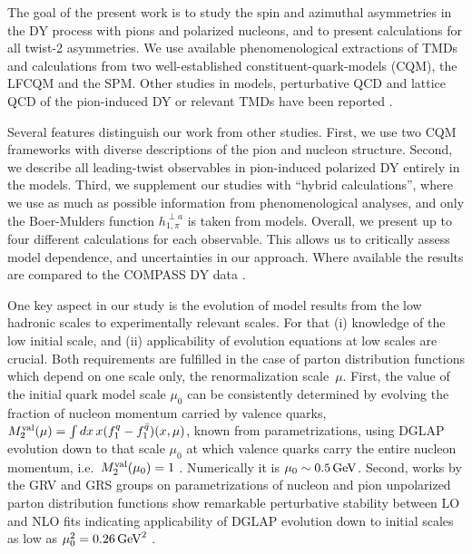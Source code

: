 \documentclass[a4paper]{article}
\begin{document}
The goal of the present work is to study the spin and azimuthal asymmetries in the DY process with pions and polarized 
nucleons, and to present calculations for all twist-2 asymmetries.  
We use available phenomenological extractions of TMDs and 
calculations from two well-established 
constituent-quark-models (CQM), the LFCQM 
and the SPM. Other studies in models, perturbative QCD and lattice QCD 
of the pion-induced DY or relevant TMDs have been reported 
\cite{Noguera:2015iia,Engelhardt:2015xja,Lambertsen:2016wgj,Chang:2018pvk,
Bacchetta:2017vzh,Broniowski:2017gfp,Ceccopieri:2018nop}.

Several features distinguish our work from other studies. First, 
we use two CQM frameworks with diverse descriptions of the 
pion and nucleon structure. Second, we describe all leading-twist 
observables in pion-induced polarized DY entirely in the models.
Third, we supplement our studies with ``hybrid calculations'',  where we
use as much as possible information from phenomenological analyses, and 
only the 
Boer-Mulders function $h_{1,\pi}^{\perp a}$ is taken from models. 
Overall, we present up to four different calculations 
for each observable. This allows us to critically assess model dependence, 
and uncertainties in our approach. Where available the results are 
compared to the COMPASS DY data \cite{Aghasyan:2017jop}.


One key aspect in our study is the evolution of model results from 
the low hadronic scales to experimentally relevant scales. For that 
(i) knowledge of the low initial scale, and (ii) applicability of evolution 
equations at low scales are crucial. Both requirements are fulfilled in
the case of parton distribution functions which depend on one scale only, 
the renormalization scale~$\mu$.
First, the value of the initial quark model scale $\mu_0$ can be consistently
determined by evolving the fraction of nucleon momentum carried by valence 
quarks, $M_2^{\rm val}(\mu) = \int dx\,x(f_1^q-f_1^{\bar q})(x,\mu)$,
known from parametrizations, using DGLAP evolution down to that scale
$\mu_0$ at which valence quarks carry the entire nucleon momentum, 
i.e.\ $M_2^{\rm val}(\mu_0) = 1$ \cite{Traini:1997jz}. 
Numerically it is $\mu_0\sim 0.5\,{\rm GeV}$. 
Second, works by the GRV and GRS groups on parametrizations of nucleon and 
pion unpolarized parton distribution functions show remarkable perturbative
stability between LO and NLO fits indicating applicability of DGLAP 
evolution down to initial scales as low as $\mu_0^2 = 0.26\,{\rm GeV}^2$ \cite{Gluck:1991ng,Gluck:1991ey,Gluck:1994uf,Gluck:1998xa,Gluck:1999xe}.
\end{document}
